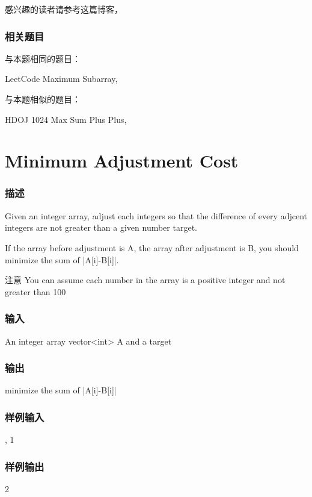 感兴趣的读者请参考这篇博客，

\subsubsection{相关题目}
与本题相同的题目：
\begindot
\item LeetCode Maximum Subarray, 
\myenddot

与本题相似的题目：
\begindot
\item HDOJ 1024 Max Sum Plus Plus, 
\myenddot


\section{Minimum Adjustment Cost}
\subsubsection{描述}
Given an integer array, adjust each integers so that the difference of every 
adjcent integers are not greater than a given number target.

If the array before adjustment is A, the array after adjustment is B, you 
should minimize the sum of |A[i]-B[i]|.

注意
You can assume each number in the array is a positive integer and not greater 
than 100

\subsubsection{输入}
An integer array vector<int> A and a target

\subsubsection{输出}
minimize the sum of |A[i]-B[i]|

\subsubsection{样例输入}
\begin{Code}
	[1,4,2,3], 1
\end{Code}

\subsubsection{样例输出}
\begin{Code}
	2
\end{Code}


